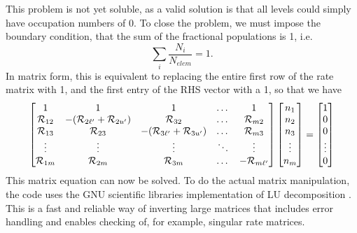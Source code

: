 %
This problem is not yet soluble, as a valid solution is that all levels 
could simply have occupation numbers of $0$. To close the problem, we must impose the boundary condition, that the sum of the fractional populations is 1, i.e.
%
\begin{equation}
\sum_i \frac{N_i}{N_{elem}} = 1.
\end{equation}
In matrix form, this is equivalent to replacing the entire first row
of the rate matrix with 1, and the first entry of the RHS vector with a 1,
so that we have
%
\begin{equation}
\begin{bmatrix}
    1  & 1 & 1 & \dots & 1\\
    {\cal R}_{12} & -({\cal R}_{2{\ell^\prime}} + {\cal R}_{2{u^\prime}}) & {\cal R}_{32} & \dots & {\cal R}_{m2} \\
    {\cal R}_{13}  & {\cal R}_{23} & -({\cal R}_{3{\ell^\prime}} + {\cal R}_{3{u^\prime}}) & \dots & {\cal R}_{m3} \\
    \vdots & \vdots & \vdots & \ddots & \vdots \\
    {\cal R}_{1m}      & {\cal R}_{2m} & {\cal R}_{3m} & \dots & -{\cal R}_{m{\ell^\prime}}
\end{bmatrix}
\begin{bmatrix}
    n_1 \\
    n_2 \\
    n_3 \\
    \vdots \\
    n_m
\end{bmatrix}
=
\begin{bmatrix}
    1 \\
    0 \\
    0 \\
    \vdots \\
    0
\end{bmatrix}
\end{equation}
%
This matrix equation can now be solved.
To do the actual matrix manipulation, the code uses the GNU 
scientific libraries \citep[GSL;][]{GSL} implementation of
LU decomposition \citep{turing}. This is a fast and reliable way of
inverting large matrices that includes error handling and enables
checking of, for example, singular rate matrices.















